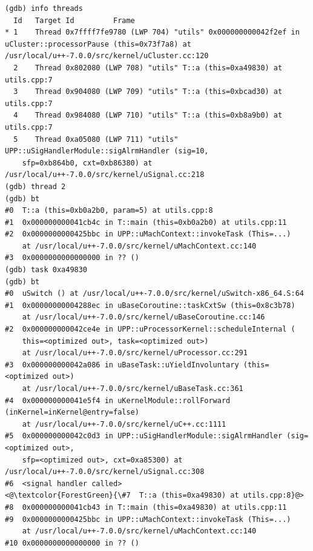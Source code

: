 \begin{lstlisting}[caption={task \<task\_address\> command}, label={pushtask}]
(gdb) info threads
  Id   Target Id         Frame
* 1    Thread 0x7ffff7fe9780 (LWP 704) "utils" 0x000000000042f2ef in uCluster::processorPause (this=0x73f7a8) at /usr/local/u++-7.0.0/src/kernel/uCluster.cc:120
  2    Thread 0x802080 (LWP 708) "utils" T::a (this=0xa49830) at utils.cpp:7
  3    Thread 0x904080 (LWP 709) "utils" T::a (this=0xbcad30) at utils.cpp:7
  4    Thread 0x984080 (LWP 710) "utils" T::a (this=0xb8a9b0) at utils.cpp:7
  5    Thread 0xa05080 (LWP 711) "utils" UPP::uSigHandlerModule::sigAlrmHandler (sig=10,
    sfp=0xb864b0, cxt=0xb86380) at /usr/local/u++-7.0.0/src/kernel/uSignal.cc:218
(gdb) thread 2
(gdb) bt
#0  T::a (this=0xb0a2b0, param=5) at utils.cpp:8
#1  0x000000000041cb4c in T::main (this=0xb0a2b0) at utils.cpp:11
#2  0x0000000000425bbc in UPP::uMachContext::invokeTask (This=...)
    at /usr/local/u++-7.0.0/src/kernel/uMachContext.cc:140
#3  0x0000000000000000 in ?? ()
(gdb) task 0xa49830
(gdb) bt
#0  uSwitch () at /usr/local/u++-7.0.0/src/kernel/uSwitch-x86_64.S:64
#1  0x00000000004288ec in uBaseCoroutine::taskCxtSw (this=0x8c3b78)
    at /usr/local/u++-7.0.0/src/kernel/uBaseCoroutine.cc:146
#2  0x000000000042ce4e in UPP::uProcessorKernel::scheduleInternal (
    this=<optimized out>, task=<optimized out>)
    at /usr/local/u++-7.0.0/src/kernel/uProcessor.cc:291
#3  0x000000000042a086 in uBaseTask::uYieldInvoluntary (this=<optimized out>)
    at /usr/local/u++-7.0.0/src/kernel/uBaseTask.cc:361
#4  0x000000000041e5f4 in uKernelModule::rollForward (inKernel=inKernel@entry=false)
    at /usr/local/u++-7.0.0/src/kernel/uC++.cc:1111
#5  0x000000000042c0d3 in UPP::uSigHandlerModule::sigAlrmHandler (sig=<optimized out>,
    sfp=<optimized out>, cxt=0xa85300) at /usr/local/u++-7.0.0/src/kernel/uSignal.cc:308
#6  <signal handler called>
<@\textcolor{ForestGreen}{\#7  T::a (this=0xa49830) at utils.cpp:8}@>
#8  0x000000000041cb43 in T::main (this=0xa49830) at utils.cpp:11
#9  0x0000000000425bbc in UPP::uMachContext::invokeTask (This=...)
    at /usr/local/u++-7.0.0/src/kernel/uMachContext.cc:140
#10 0x0000000000000000 in ?? ()
\end{lstlisting}

